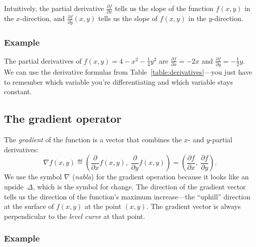 		Intuitively,
		the partial derivative $\frac{\partial f}{\partial x}$
		tells us the slope of the function $f(x,y)$ in the $x$-direction,
		and $\frac{\partial f}{\partial y}(x,y)$ tells us the slope of $f(x,y)$
		in the $y$-direction.


		\subsubsection{Example}

			The partial derivatives of $f(x,y) = 4 - x^2 - \frac{1}{4}y^2$ are
			$\frac{\partial f}{\partial x} = -2x$ and $\frac{\partial f}{\partial y} = -\tfrac{1}{2}y$.
			We can use the derivative formulas from Table~\ref{table:derivatives}---you
			just have to remember which variable you're differentiating
			and which variable stays constant.

	\subsection{The gradient operator}

		The \emph{gradient} of the function
		is a vector that combines the $x$- and $y$-partial derivatives:
		\[
			\nabla f(x,y)
			\eqdef
			\left(
				\frac{\partial}{\partial x}f(x,y), \;
				\frac{\partial}{\partial y}f(x,y)
			\right)
			=
			\left(
				\frac{\partial f}{\partial x}, \;
				\frac{\partial f}{\partial y}
			\right).
		\]
		We use the symbol $\nabla$ (\emph{nabla}) for the gradient operation because it looks like an upside~$\Delta$,
		which is the symbol for change.
		The direction of the gradient vector tells us the direction of the function's maximum increase---the
		``uphill'' direction at the surface of $f(x,y)$ at the point $(x,y)$.
		The gradient vector is always perpendicular to the \emph{level curve} at that point.

		\subsubsection{Example}

